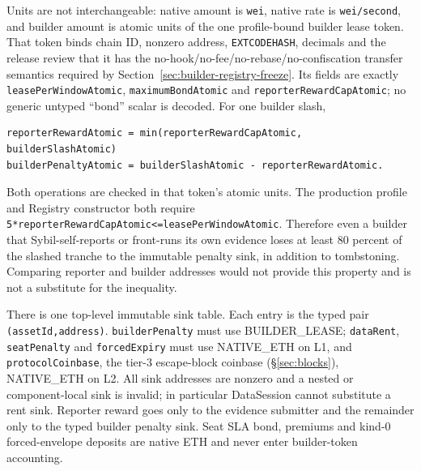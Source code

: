 \documentclass[a4paper,11pt]{article}
\newcommand{\code}[1]{\nolinkurl{#1}}
\begin{document}
Units are not interchangeable: native amount is \code{wei}, native
rate is \code{wei/second}, and builder amount is atomic units of the one
profile-bound builder lease token.  That token binds chain ID, nonzero address,
\code{EXTCODEHASH}, decimals and the release review that it has the
no-hook/no-fee/no-rebase/no-confiscation transfer semantics required by
Section~\ref{sec:builder-registry-freeze}.  Its fields are exactly
\code{leasePerWindowAtomic}, \code{maximumBondAtomic} and
\code{reporterRewardCapAtomic}; no generic untyped ``bond'' scalar is decoded.
For one builder slash,
\begin{verbatim}
reporterRewardAtomic = min(reporterRewardCapAtomic, builderSlashAtomic)
builderPenaltyAtomic = builderSlashAtomic - reporterRewardAtomic.
\end{verbatim}
Both operations are checked in that token's atomic units.
The production profile and Registry constructor both require
\code{5*reporterRewardCapAtomic<=leasePerWindowAtomic}.  Therefore even a
builder that Sybil-self-reports or front-runs its own evidence loses at least
80 percent of the slashed tranche to the immutable penalty sink, in addition
to tombstoning.  Comparing reporter and builder addresses would not provide
this property and is not a substitute for the inequality.

There is one top-level immutable sink table.  Each entry is the typed pair
\code{(assetId,address)}.  \code{builderPenalty} must use BUILDER\_LEASE;
\code{dataRent}, \code{seatPenalty} and \code{forcedExpiry} must use
NATIVE\_ETH on L1, and \code{protocolCoinbase}, the tier-3 escape-block
coinbase (\S\ref{sec:blocks}), NATIVE\_ETH on L2.
All sink addresses are nonzero and a nested or component-local sink is invalid;
in particular DataSession cannot substitute a rent sink.  Reporter reward goes
only to the evidence submitter and the remainder only to the typed builder
penalty sink.  Seat SLA bond, premiums and kind-0 forced-envelope deposits are
native ETH and never enter builder-token accounting.
\end{document}
